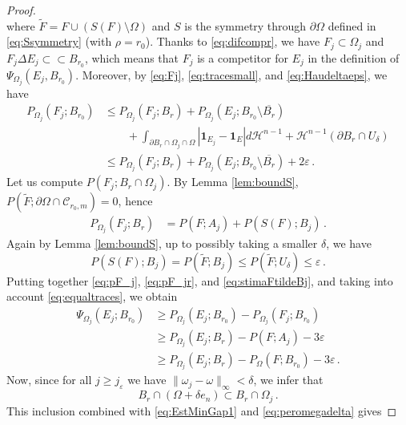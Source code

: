 \documentclass[a4paper,reqno,11pt]{amsart}
\newcommand{\e}{\varepsilon}
\newcommand{\Hau}{{\mathcal H}} %
\newcommand{\de}{\partial}
\newcommand{\difsim}{\Delta}
\newcommand{\ch}{\mathbf{1}}
\newcommand{\cC}{\mathcal{C}}
\newcommand{\pr}{P_{\Omega}}
\newcommand{\p}{P}
\begin{document}
\begin{proof}
\begin{equation}
\end{equation}
where $\tilde{F}=F\cup (S(F)\setminus \Omega)$ and $S$ is the symmetry through $\de \Omega$ defined in \eqref{eq:Ssymmetry} (with $\rho = r_{0}$). Thanks to \eqref{eq:difcompr}, we have $F_{j}\subset \Omega_{j}$ and $F_{j} \difsim E_{j} \subset \subset B_{r_{0}}$, which means that $F_{j}$ is a competitor for $E_{j}$ in the definition of $\Psi_{\Omega_{j}}(E_{j},B_{r_{0}})$. Moreover, by \eqref{eq:Fj}, \eqref{eq:tracesmall}, and \eqref{eq:Haudeltaeps}, we have
\begin{align} \nonumber
\p_{\Omega_{j}}(F_{j};B_{r_{0}}) & \le \p_{\Omega_{j}}(F_{j};B_{r}) + \p_{\Omega_{j}}(E_{j};B_{r_{0}} \setminus \overline{B_{r}}) \\
& \qquad + \int_{\de B_{r} \cap \Omega_{j}\cap \Omega} |\ch_{E_{j}} - \ch_{E}| d \Hau^{n-1} + \Hau^{n-1}(\de B_{r}\cap U_{\delta}) \nonumber \\
\label{eq:pF_j}
&\le \p_{\Omega_{j}}(F_{j};B_{r}) + \p_{\Omega_{j}}(E_{j};B_{r_{0}} \setminus \overline{B_{r}}) + 2\e\,.
\end{align}
Let us compute $\p(F_{j};B_{r} \cap \Omega_{j})$. By Lemma \ref{lem:boundS}, $\p(\tilde F;\de \Omega\cap \cC_{r_{0},m})=0$, hence
	    \begin{align} \label{eq:pF_jr}
	    	\p_{\Omega_{j}}(F_j;B_r) & = \p(F;A_j) + \p(S(F);B_j)\, .
	    \end{align}
        Again by Lemma \ref{lem:boundS}, up to possibly taking a smaller $\delta$, we have
\begin{equation}\label{eq:stimaFtildeBj}
\p(S(F);B_j) = \p(\tilde{F};B_{j}) \le \p(\tilde{F};U_\delta) \leq \e\,.
\end{equation}
Putting together \eqref{eq:pF_j}, \eqref{eq:pF_jr}, and \eqref{eq:stimaFtildeBj}, and taking into account \eqref{eq:equaltraces}, we obtain
\begin{align} \label{eq:EstMinGap1}
\Psi_{\Omega_{j}}(E_{j};B_{r_{0}}) & \geq \p_{\Omega_{j}}(E_{j};B_{r_{0}}) - \p_{\Omega_{j}}(F_{j};B_{r_{0}}) \\
			& \ge \p_{\Omega_{j}}(E_{j};B_{r}) - \p(F; A_{j}) -3\e\nonumber \\
			& \geq \p_{\Omega_{j}}(E_{j};B_{r}) - \pr(F;B_{r_{0}}) -3\e\, . \nonumber
		\end{align}
Now, since for all $j\ge j_{\e}$ we have $\|\omega_{j}-\omega\|_{\infty}<\delta$, we infer that
\[
B_{r}\cap (\Omega+\delta e_{n}) \subset B_{r}\cap \Omega_{j}\,.
\]
This inclusion combined with \eqref{eq:EstMinGap1} and \eqref{eq:peromegadelta} gives

\end{proof}
\end{document}
